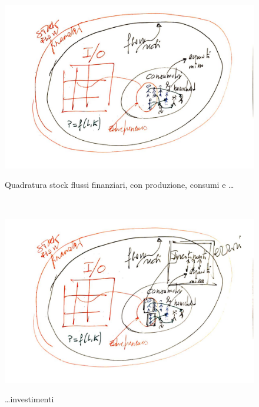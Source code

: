 \documentclass[9pt]{beamer}
\begin{document}
\begin{frame}{~} %



\begin{figure}[H]
\center
\includegraphics[scale=0.50]{3.pdf}
\label{3}
\caption{Quadratura stock flussi finanziari, con produzione, consumi e \ldots}
\end{figure}

\end{frame}

\begin{frame}{~} %



\begin{figure}[H]
\center
\includegraphics[scale=0.50]{4.pdf}
\label{4}
\caption{\ldots investimenti}
\end{figure}

\end{frame}
\end{document}
